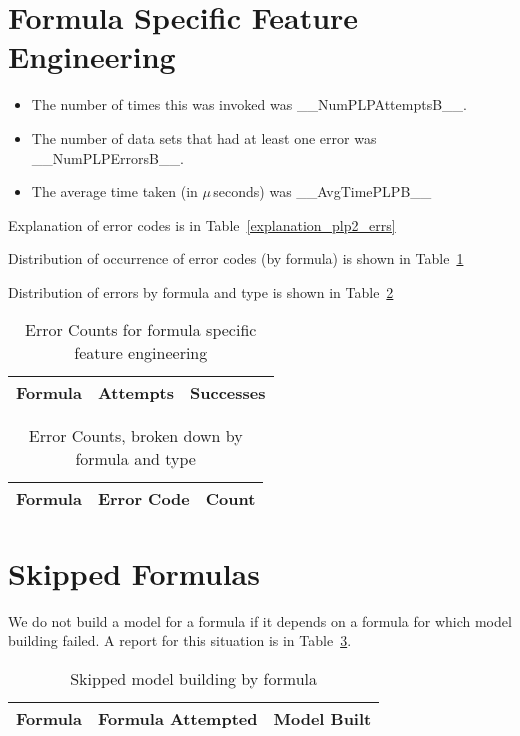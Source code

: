 \documentclass[letterpaper,12pt]{article}
\newcommand{\bi}{\begin{itemize}}
\newcommand{\ei}{\end{itemize}}
\newcommand{\NumPLPErrorsB}{__NumPLPErrorsB__}
\newcommand{\NumPLPAttemptsB}{__NumPLPAttemptsB__}
\newcommand{\AvgTimePLPB}{__AvgTimePLPB__}
\begin{document}
\section{Formula Specific Feature Engineering}
\label{PLP2}

\bi
\item The number of times this was invoked was \NumPLPAttemptsB.
\item The number of data sets that had at least one error was
  \NumPLPErrorsB.
\item The average time taken (in \(\mu\,\)seconds) was \AvgTimePLPB
\ei
Explanation of error codes is in Table~\ref{explanation_plp2_errs}

Distribution of occurrence of error codes (by formula) is shown in Table~\ref{plp2_errs}

Distribution of errors by formula and type is shown in Table~\ref{plp2_errs_B}

\begin{table}
  \centering
  \begin{tabular}{|l|l|l|} \hline \hline
    {\bf Formula} & {\bf Attempts} & {\bf Successes} \\ \hline 
     
    \hline
  \end{tabular}
  \caption{Error Counts for formula specific feature engineering}
  \label{plp2_errs}
\end{table}

\begin{table}
  \centering
  \begin{tabular}{|l|l|l|} \hline \hline
    {\bf Formula} & {\bf Error Code} & {\bf Count} \\ \hline 
      
    \hline
  \end{tabular}
  \caption{Error Counts, broken down by formula and type}
  \label{plp2_errs_B}
\end{table}

\section{Skipped Formulas}

We do not build a model for a formula if it depends on a formula for which model
building failed. A report for this situation is in Table~\ref{tbl_frmla_skips}.

\begin{table}
  \centering
  \begin{tabular}{|l|l|l|} \hline \hline
    {\bf Formula} & {\bf Formula Attempted } & {\bf Model Built} \\ \hline
    \hline
    
    \hline
  \end{tabular}
  \caption{Skipped model building by formula }
  \label{tbl_frmla_skips}
\end{table}
\end{document}
